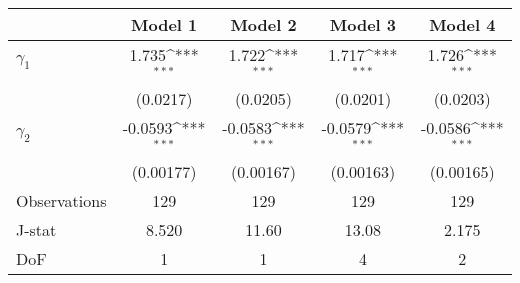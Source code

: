 {
\newcommand{\sym}[1]{\ifmmode^{#1}\else\(^{#1}\)\fi}
\begin{tabular}{l*{4}{c}}
\hline\hline
                    &\multicolumn{1}{c}{Model 1}&\multicolumn{1}{c}{Model 2}&\multicolumn{1}{c}{Model 3}&\multicolumn{1}{c}{Model 4}\\
\hline
$\gamma_1$            &       1.735\sym{***}&       1.722\sym{***}&       1.717\sym{***}&       1.726\sym{***}\\
                    &    (0.0217)         &    (0.0205)         &    (0.0201)         &    (0.0203)         \\
\hline
$\gamma_2$            &     -0.0593\sym{***}&     -0.0583\sym{***}&     -0.0579\sym{***}&     -0.0586\sym{***}\\
                    &   (0.00177)         &   (0.00167)         &   (0.00163)         &   (0.00165)         \\
\hline
Observations        &         129         &         129         &         129         &         129         \\
J-stat              &       8.520         &       11.60         &       13.08         &       2.175         \\
DoF                 &           1         &           1         &           4         &           2         \\
\hline\hline
\end{tabular}
}
